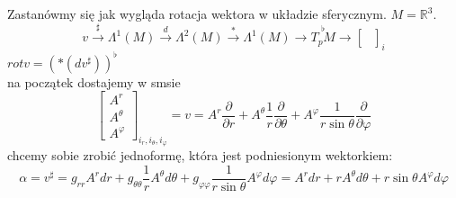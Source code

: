 \documentclass[../main.tex]{subfiles}
\begin{document}
\begin{przyklad}
    Zastanówmy się jak wygląda rotacja wektora w układzie sferycznym. $M = \mathbb{R}^3$.
    \[
        v \overset{\sharp}{\to} \Lambda^1(M) \overset{d}{\to} \Lambda^2(M) \overset{\ast}{\to} \Lambda^1(M) \to \overset{\flat}{T_pM} \to \begin{bmatrix} \\ \\ \end{bmatrix}_{i}
    \]
        $rot v = \left( \ast (d v^\sharp) \right)^{\flat}$\\
        na początek dostajemy w smsie
        \[
            \begin{bmatrix} A^r \\ A^\theta \\ A^\varphi \end{bmatrix}_{i_r, i_\theta, i_\varphi} = v = A^r \frac{\partial }{\partial r} + A^\theta \frac{1}{r} \frac{\partial }{\partial \theta} + A^\varphi \frac{1}{r\sin\theta} \frac{\partial }{\partial \varphi}
        \]
        chcemy sobie zrobić jednoformę, która jest podniesionym wektorkiem:
        \[
            \alpha = v^\sharp = g_{rr} A^r dr + g_{\theta\theta} \frac{1}{r} A^\theta d\theta + g_{\varphi\varphi} \frac{1}{r\sin\theta}A^\varphi d\varphi = A^r dr + r A^\theta d\theta + r\sin\theta A^\varphi d\varphi
        \]


\end{przyklad}
\end{document}
